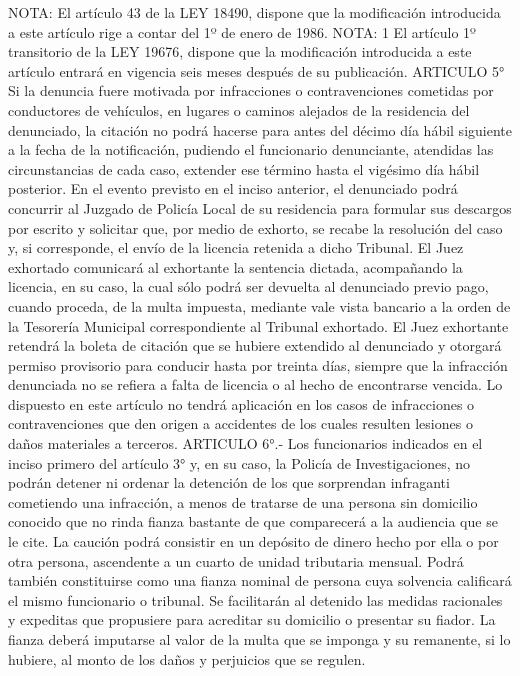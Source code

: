 NOTA:
    El artículo 43 de la LEY 18490, dispone que la modificación introducida a este artículo rige a contar del 1º de enero de 1986.
NOTA:  1
      El artículo 1º transitorio de la LEY 19676, dispone que la modificación introducida a este artículo entrará en vigencia seis meses después de su publicación.
    ARTICULO 5° Si la denuncia fuere motivada por infracciones o contravenciones cometidas por conductores de vehículos, en lugares o caminos alejados de la residencia del denunciado, la citación no podrá hacerse para antes del décimo día hábil siguiente a la fecha de la notificación, pudiendo el funcionario denunciante, atendidas las circunstancias de cada caso, extender ese término hasta el vigésimo día hábil posterior.
    En el evento previsto en el inciso anterior, el denunciado podrá concurrir al Juzgado de Policía Local de su residencia para formular sus descargos por escrito y solicitar que, por medio de exhorto, se recabe la resolución del caso y, si corresponde, el envío de la licencia retenida a dicho Tribunal. El Juez exhortado comunicará al exhortante la sentencia dictada, acompañando la licencia, en su caso, la cual sólo podrá ser devuelta al denunciado previo pago, cuando proceda, de la multa impuesta, mediante vale vista bancario a la orden de la Tesorería Municipal correspondiente al Tribunal exhortado. El Juez exhortante retendrá la boleta de citación que se hubiere extendido al denunciado y otorgará permiso provisorio para conducir hasta por treinta días, siempre que la infracción denunciada no se refiera a falta de licencia o al hecho de encontrarse vencida.
    Lo dispuesto en este artículo no tendrá aplicación en los casos de infracciones o contravenciones que den origen a accidentes de los cuales resulten lesiones o daños materiales a terceros.
    ARTICULO 6°.- Los funcionarios indicados en el inciso primero del artículo 3° y, en su caso, la Policía de Investigaciones, no podrán detener ni ordenar la detención de los que sorprendan infraganti cometiendo una infracción, a menos de tratarse de una persona sin domicilio conocido que no rinda fianza bastante de que comparecerá a la audiencia que se le cite.
    La caución podrá consistir en un depósito de dinero hecho por ella o por otra persona, ascendente a un cuarto de unidad tributaria mensual. Podrá también constituirse como una fianza nominal de persona cuya solvencia calificará el mismo funcionario o tribunal. Se facilitarán al detenido las medidas racionales y expeditas que propusiere para acreditar su domicilio o presentar su fiador. La fianza deberá imputarse al valor de la multa que se imponga y su remanente, si lo hubiere, al monto de los daños y perjuicios que se regulen.
